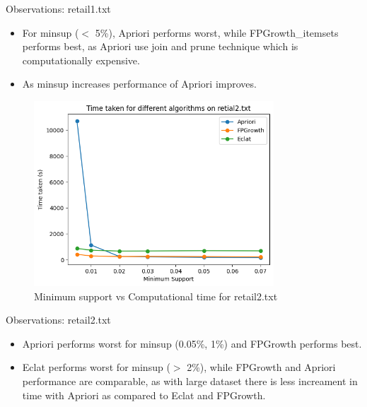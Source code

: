 \documentclass[12pt]{article}
\begin{document}
Observations: retail1.txt
\begin{itemize}
    \item For minsup ($<$ 5\%), Apriori performs worst, while FPGrowth\_itemsets performs best, as Apriori use join and prune technique which is computationally expensive.
    \item As minsup increases performance of Apriori improves.
\end{itemize}

\clearpage

\begin{figure}[h]
    \centering
    \includegraphics[width=0.8\textwidth]{1b.png}
    \caption{Minimum support vs Computational time for retail2.txt}
\end{figure}
Observations: retail2.txt
\begin{itemize}
    \item Apriori performs worst for minsup (0.05\%, 1\%) and FPGrowth performs best.
    \item Eclat performs worst for minsup ($>$ 2\%), while FPGrowth and Apriori performance are comparable, as with large dataset there is less increament in time with Apriori as compared to Eclat and FPGrowth.
\end{itemize}


\end{document}
